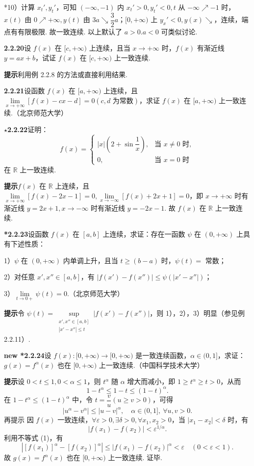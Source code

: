 \documentclass[UTF8,12pt,a4paper,fontset=fandol]{ctexart}
\begin{document}
*10）计算 $x_t',y_t'$，可知 $(-\infty,-1)$ 内 $x_t'>0,y_t'<0,t$ 从 $-\infty\nearrow -1$ 时，$x(t)$ 由 $0\nearrow+\infty,y(t)$ 由
  $3a\searrow\dfrac32a$；$[0,+\infty)$ 上 $y_x'<0,y(x)\searrow$，连续，端点有有限极限. 故一致连续. 以上默认了 $a>0.a<0$ 可类似讨论.

\noindent\textbf{2.2.20}\quad 设 $f(x)$ 在 $[c,+\infty)$ 上连续，且当 $x\to+\infty$ 时，$f(x)$ 有渐近线 $y=ax+b$，试证 $f(x)$ 在 $[c,+\infty)$ 上一致连续.

\noindent\textbf{提示}\quad 利用例 2.2.8 的方法或直接利用结果.

\noindent\textbf{2.2.21}\quad 设函数 $f(x)$ 在 $[a,+\infty)$ 上连续，且 $\lim\limits_{x\to+\infty}[f(x)-cx-d]=0(c,d\text{ 为常数})$，求证 $f(x)$ 在 $[a,+\infty)$ 上一致连续.（北京师范大学）

\noindent\textbf{$\star$2.2.22}\quad 证明：
\[
  f(x)=
  \begin{cases}
    |x|\left(2+\sin\dfrac1x\right), & \text{当 }x\ne0\text{ 时},\\
    0, & \text{当 }x=0\text{ 时}
  \end{cases}
\]
在 $\mathbb{R}$ 上一致连续.

\noindent\textbf{提示}\quad $f(x)$ 在 $\mathbb{R}$ 上连续，且 $\lim\limits_{x\to+\infty}[f(x)-2x-1]=0,\lim\limits_{x\to-\infty}[f(x)+2x+1]=0$，即 $x\to+\infty$ 时有渐近线 $y=2x+1,x\to-\infty$ 时有渐近线 $y=-2x-1$. 故 $f(x)$ 在 $\mathbb{R}$ 上一致连续.

\noindent\textbf{*2.2.23}\quad 设函数 $f(x)$ 在 $[a,b]$ 上连续，求证：存在一函数 $\psi$ 在 $(0,+\infty)$ 上具有下述性质：

1）$\psi$ 在 $(0,+\infty)$ 内单调上升，且当 $t\ge(b-a)$ 时，$\psi(t)=$ 常数；

2）对任意 $x',x''\in[a,b]$，有 $|f(x')-f(x'')|\le\psi(|x'-x''|)$；

3）$\lim\limits_{t\to0+}\psi(t)=0$.（北京师范大学）

\noindent\textbf{提示}\quad 令 $\psi(t)=\sup\limits_{\substack{x',x''\in[a,b]\\ |x'-x''|\le t}}|f(x')-f(x'')|$，则 1），2），3）明显（参见例 2.2.11）.

\noindent\textbf{new *2.2.24}\quad 设 $f(x):[0,+\infty)\to[0,+\infty)$ 是一致连续函数，$\alpha\in(0,1]$，求证：$g(x)=f^\alpha(x)$ 也在 $[0,+\infty)$ 上一致连续.（中国科学技术大学）

\noindent\textbf{提示}\quad 设 $0<t\le1,0<\alpha\le1$，则 $t^\alpha$ 随 $\alpha$ 增大而减小，即 $1\ge t^\alpha\ge t>0$，从而
\[
  1-t^\alpha\le1-t\le(1-t)^\alpha.
\]
在 $1-t^\alpha\le(1-t)^\alpha$ 中，令 $t=\dfrac vu(u\ge v>0)$，可得
\[
  |u^\alpha-v^\alpha|\le |u-v|^\alpha,\quad \alpha\in(0,1],\ \forall u,v>0. \tag{1}
\]
再提示 因 $f(x)$ 一致连续，$\forall\varepsilon>0,\exists\delta>0,\forall x_1,x_2>0$，当 $|x_1-x_2|<\delta$ 时，有
\[
  |f(x_1)-f(x_2)|<\varepsilon^{1/\alpha}.
\]
利用不等式 (1)，有
\[
  |[f(x_1)]^\alpha-[f(x_2)]^\alpha|\le |f(x_1)-f(x_2)|^\alpha<\varepsilon\quad(0<\varepsilon<1).
\]
故 $g(x)=f^\alpha(x)$ 也在 $[0,+\infty)$ 上一致连续. 证毕.
\end{document}
